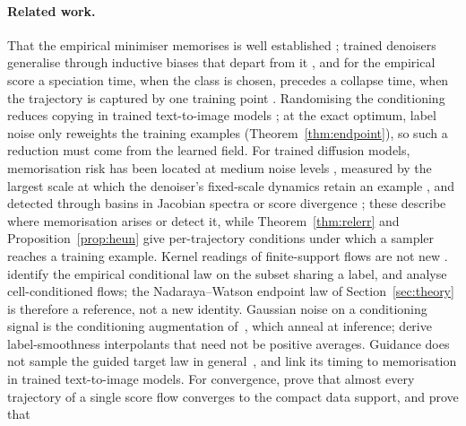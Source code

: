\documentclass{article} %
\theoremstyle{plain}
\theoremstyle{definition}
\theoremstyle{remark}
\begin{document}
\paragraph{Related work.} That the empirical minimiser memorises is well established
\citep{pidstrigach2022manifolds,gu2023memorization,biroli2023diffusion,buchanan2025edge,gao2024flow,bertrand2025closed,li2026memory};
trained denoisers generalise through inductive biases that depart from it
\citep{kadkhodaie2024generalization,kamb2024creativity,niedoba2024mechanistic}, and for the
empirical score a speciation time, when the class is chosen, precedes a collapse time, when the
trajectory is captured by one training point \citep{biroli2024dynamical}. Randomising the
conditioning reduces copying in trained text-to-image models \citep{somepalli2023copying}; at the
exact optimum, label noise only reweights the training examples (Theorem~\ref{thm:endpoint}), so
such a reduction must come from the learned field. For trained diffusion
models, memorisation risk has been located at medium noise levels \citep{dodson2026calm}, measured by
the largest scale at which the denoiser's fixed-scale dynamics retain an example
\citep{lopezamado2026modes}, and detected through basins in Jacobian spectra or score divergence
\citep{jaziri2026spectral,verma2026early}; these describe where memorisation arises or detect it,
while Theorem~\ref{thm:relerr} and Proposition~\ref{prop:heun} give per-trajectory conditions under
which a sampler reaches a training example. Kernel readings of finite-support flows are not new
\citep{scarvelis2025closedform,chen2026scoresmoothing,smola2026support}.
\citet[Theorem~6.4]{baptista2025memorization} identify the empirical conditional law on the
subset sharing a label, and \citet[Section~3.3]{physicscfm2026} analyse cell-conditioned flows;
the Nadaraya--Watson endpoint law of Section~\ref{sec:theory} is therefore a reference, not a new
identity. Gaussian noise on a conditioning signal is the conditioning augmentation
of~\citet{ho2022cascaded}, which \citet{sadat2024cads} anneal at inference;
\citet[Theorems~2--3]{pfrommer2025conditional} derive label-smoothness interpolants that need not
be positive averages. Guidance does not sample the guided target law in
general~\citep{chidambaram2024guidance}, and \citet{jain2025attraction} link its timing to
memorisation in trained text-to-image models. For convergence,
\citet[Theorem~3.7, version~3]{liu2025pde} prove that almost every trajectory of a single score
flow converges to the compact data support, and \citet[Theorem~3.18]{liu2026geometric} prove that
\end{document}
